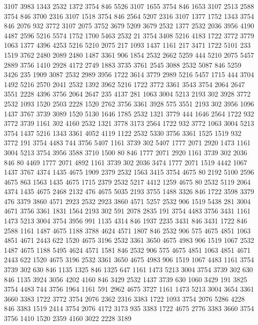{} 3107 3983 1343 2532 1372 {} 3754 846 5526
{} 3107 1655 3754 846 1653
{} 3107 2513 2588 3754 846 3700 2316
{} 3107 1518 3754 846 2564 5207 2316
{} 3107 1377 1752 1343 3754 846 2076 932 3772
{} 3107 2075 3752 3679 5209 3679 2532 1377 2532 2036 3956 4190 4487 2596 5216 5574 1752 1700
{} 5463 2532 21 3754 3408 5216 4183 1722 3772 3779 1063 1377 4396 4253 5216
{} 5210 2075 217 1093 1437 1161 217 3471 1722 5101 233 1519 3762 2480 2089 {} 2480 1487 3361 {} 906 1854 2532 2662 5259 444
{} 5210 2075 5457 2889 3756 1410 2928 4172 2749 1883 3735
{} 3761 2545 {} 3088 2532 5087 846 5259 3426 235 1909 3087 2532 2989 3956 1722 3614
{} 3779 2989 5216 5457 1715 444 3704 1492 5216 2570 2041 2532 1392 3962 5216 1722 3772
{} 3361 3543 3754 2064 2647 3551 2228 4396 3756 2064 2647 235 4137
{} 281 1063 3004 5213 2193 302 3928 3772 2532 1093 1520 2503 2228 1520 2762 3756 3361 3928 575 3551 2193 302 3956 1096
{} 1437 3767 3739 3089 1520 5130 1646 1785 2532 1321 3779 444 1646 2564 1722 932 3772 3739 1161 302 4160 2532 1321 3778 3173 2564 1722 932 3772
{} 1063 3004 5213 3754 1437 5216 1343 3361 4052 4119 {} 1122 2532 5330 3756 3361 1525 1519 932 3772
{} 191 3754 4483 744 3756 5407 1161 3739 {} 302 5407 1777 2071 2920
{} 1473 1161 3004 5213 3754 3956 3588 3710 1500 {} 80 846 1777 2071 2920 1161 3739 302 2036 846 80 4469 1777 2071 4892 1161 3739 302 2036 3474 1777 2071 1519 4442 1067
{} 1437 3767 4374 1435 4675 1909 2379 2532 1563 3415 3754 4675 80 2192 5100 2596 4675
{} 863 1563 1435 4675 1715 2379 2532 5217 4412 1259 4675 80 2532 5119 2064 4374 1435 4675
{} 2468 2132 476 4675 5035 2193 3755 1488 3326 846 1722 3598 3379 476 3379 3860 4571 2923 2532 2923 3860 4571 5257 2532 906 1519 5438
{} 281 3004 4671 3756 3361 1831 1564 2193 302 591 2078 2835
{} 191 3754 4483 3756 3431
{} 1161 1473 5213 3004 3754 3956 991 1135 4314 846 1937 2235 3431 846 3431 1722 846 2588
{} 1161 1487 4675 1188 3788 4624 4571 1807 846 2532 906 575 4675 4851 1063 4851 4671 2443 622 1520 4675 3196 2532 3361 {} 3650 4675 4983 906 1519 1067
{} 2532 1487 4675 1188 5495 4624 4571 1581 846 2532 906 575 4675 4851 1063 4851 4671 2443 622 1520 4675 3196 2532 3361 {} 3650 4675 4983 906 1519 1067
{} 4483 1161 3754 3739 302 630 846 1135 1325 846 1325 647
{} 1161 1473 5213 3004 3754 3739 302 630 846 1135 3924 3056 4202 4160 846 3429 2532 1437 3739 630 1060 3429
{} 191 3825 3754 4483 744 3756 1964 1161 591 2962 4675 3727
{} 1161 1473 5213 3004 3654 3361 3660 3383 1722 3772 3754 2076 2362 2316
{} 3383 1722 1093 3754 2076 5286 4228 846 3383 1519 2414 3754 2076 4172 3173 935
{} 3383 1722 4675 2776 3383 3660 3754 3756 1410 1520 2359 4160 3022 2228 3189
